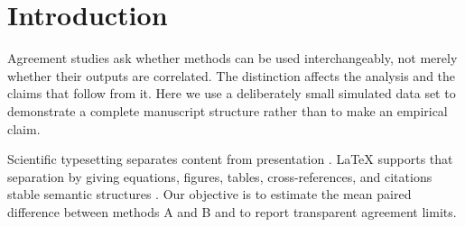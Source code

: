 \section{Introduction}
\label{sec:introduction}

Agreement studies ask whether methods can be used interchangeably, not merely
whether their outputs are correlated. The distinction affects the analysis and
the claims that follow from it. Here we use a deliberately small simulated data
set to demonstrate a complete manuscript structure rather than to make an
empirical claim.

Scientific typesetting separates content from presentation
\parencite{knuth1984}. \LaTeX{} supports that separation by giving equations,
figures, tables, cross-references, and citations stable semantic structures
\parencite{lamport1994}. Our objective is to estimate the mean paired difference
between methods A and B and to report transparent agreement limits.
